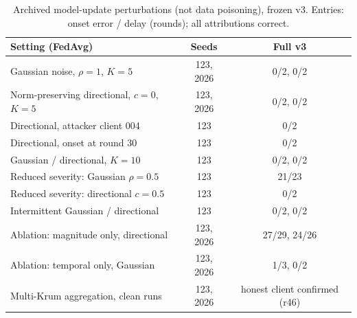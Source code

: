 \begin{table}[t]
\centering\footnotesize
\setlength{\tabcolsep}{3pt}
\caption{Archived model-update perturbations (not data poisoning), frozen v3. Entries: onset error / delay (rounds); all attributions correct.}
\label{tab:archived}
\begin{tabular}{@{}lcc@{}}
\toprule
Setting (FedAvg) & Seeds & Full v3 \\
\midrule
Gaussian noise, $\rho=1$, $K=5$ & 123, 2026 & 0/2, 0/2 \\
Norm-preserving directional, $c=0$, $K=5$ & 123, 2026 & 0/2, 0/2 \\
Directional, attacker client 004 & 123 & 0/2 \\
Directional, onset at round 30 & 123 & 0/2 \\
Gaussian / directional, $K=10$ & 123 & 0/2, 0/2 \\
Reduced severity: Gaussian $\rho=0.5$ & 123 & 21/23 \\
Reduced severity: directional $c=0.5$ & 123 & 0/2 \\
Intermittent Gaussian / directional & 123 & 0/2, 0/2 \\
\midrule
Ablation: magnitude only, directional & 123, 2026 & 27/29, 24/26 \\
Ablation: temporal only, Gaussian & 123, 2026 & 1/3, 0/2 \\
\midrule
Multi-Krum aggregation, clean runs & 123, 2026 & honest client confirmed (r46) \\
\bottomrule
\end{tabular}
\end{table}
